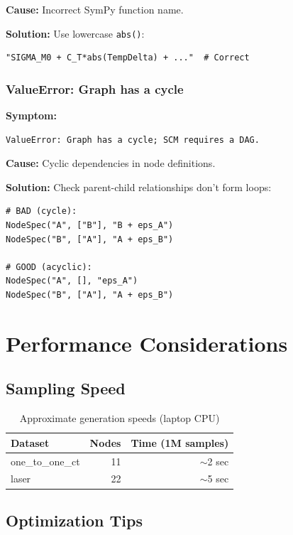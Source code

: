 \documentclass[11pt,a4paper]{article}
\begin{document}
\textbf{Cause:} Incorrect SymPy function name.

\textbf{Solution:} Use lowercase \texttt{abs()}:
\begin{lstlisting}
"SIGMA_M0 + C_T*abs(TempDelta) + ..."  # Correct
\end{lstlisting}

\subsubsection{ValueError: Graph has a cycle}

\textbf{Symptom:}
\begin{verbatim}
ValueError: Graph has a cycle; SCM requires a DAG.
\end{verbatim}

\textbf{Cause:} Cyclic dependencies in node definitions.

\textbf{Solution:} Check parent-child relationships don't form loops:
\begin{lstlisting}
# BAD (cycle):
NodeSpec("A", ["B"], "B + eps_A")
NodeSpec("B", ["A"], "A + eps_B")

# GOOD (acyclic):
NodeSpec("A", [], "eps_A")
NodeSpec("B", ["A"], "A + eps_B")
\end{lstlisting}

\section{Performance Considerations}

\subsection{Sampling Speed}

\begin{table}[h]
\centering
\begin{tabular}{@{}lrr@{}}
\toprule
Dataset & Nodes & Time (1M samples) \\
\midrule
one\_to\_one\_ct & 11 & $\sim$2 sec \\
laser & 22 & $\sim$5 sec \\
\bottomrule
\end{tabular}
\caption{Approximate generation speeds (laptop CPU)}
\end{table}

\subsection{Optimization Tips}
\end{document}
